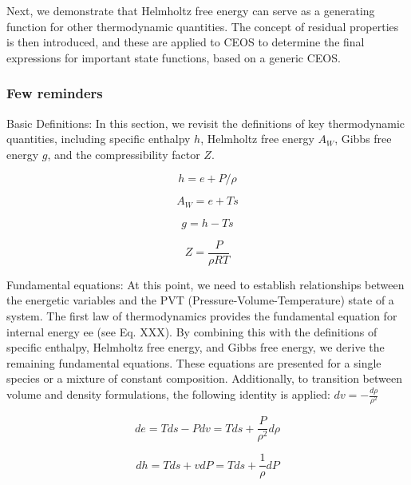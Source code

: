 	Next, we demonstrate that Helmholtz free energy can serve as a generating
	function for other thermodynamic quantities. The concept of residual properties
	is then introduced, and these are applied to CEOS to determine the final
	expressions for important state functions, based on a generic CEOS.

	\subsubsection{Few reminders}

	Basic Definitions: In this section, we revisit the definitions of key
	thermodynamic quantities, including specific enthalpy $h$, Helmholtz free
	energy $A_W$, Gibbs free energy $g$, and the compressibility factor $Z$.

	\begin{equation}
		h = e + P/\rho
	\end{equation}

	\begin{equation}
		A_W = e + Ts
	\end{equation}

	\begin{equation}
		g = h - Ts
	\end{equation}

	\begin{equation}
		Z = \frac{P}{\rho RT}
	\end{equation}

	Fundamental equations: At this point, we need to establish relationships between the energetic
	variables and the PVT (Pressure-Volume-Temperature) state of a system. The
	first law of thermodynamics provides the fundamental equation for internal
	energy ee (see Eq. XXX). By combining this with the definitions of
	specific enthalpy, Helmholtz free energy, and Gibbs free energy, we derive
	the remaining fundamental equations. These equations are presented for a
	single species or a mixture of constant composition. Additionally, to
	transition between volume and density formulations, the following identity
	is applied: $dv = -\frac{d\rho}{\rho ^2}$

	\begin{equation}
		de = Tds - Pdv = Tds + \frac{P}{\rho ^2}d\rho
	\end{equation}

	\begin{equation}
		dh = Tds + vdP = Tds + \frac{1}{\rho}dP
	\end{equation}

